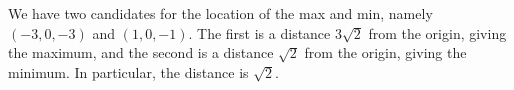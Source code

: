 \begin{eg}
\medskip
{} We have two candidates for the location
of the max and min, namely $(-3,0,-3)$ and $(1,0,-1)$. The first is a distance
$3\sqrt{2}$ from the origin, giving the maximum, and the second is a 
distance $\sqrt{2}$ from the origin, giving the minimum. In particular,
the distance is $\sqrt{2}$.

\end{eg}

